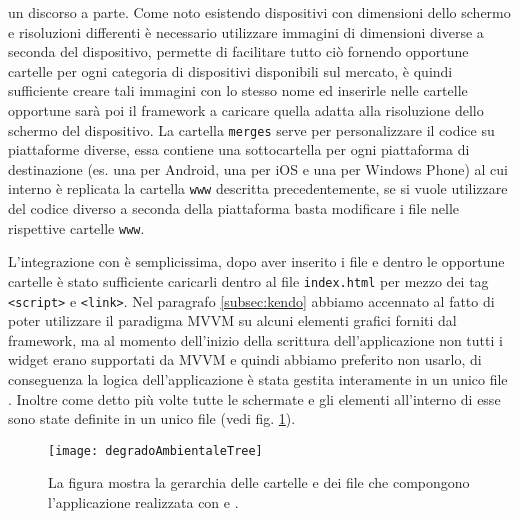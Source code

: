             un discorso a parte. Come noto esistendo
            dispositivi con dimensioni dello schermo e risoluzioni differenti
            è necessario utilizzare immagini di dimensioni diverse a seconda
            del dispositivo, \pg{} permette di facilitare tutto ciò fornendo
            opportune cartelle per ogni categoria di dispositivi disponibili sul
            mercato, è quindi sufficiente creare tali immagini con lo stesso nome
            ed inserirle nelle cartelle opportune sarà poi il framework a caricare
            quella adatta alla risoluzione dello schermo del dispositivo.
            La cartella \texttt{merges} serve per personalizzare il codice su piattaforme
            diverse, essa contiene una sottocartella per ogni piattaforma di destinazione
            (es. una per Android, una per iOS e una per Windows Phone)
            al cui interno è replicata la cartella \texttt{www} descritta precedentemente,
            se si vuole utilizzare del codice diverso a seconda della piattaforma
            basta modificare i file nelle rispettive cartelle \texttt{www}.

            L'integrazione con \kendomob{} è semplicissima, dopo aver inserito
            i file \js{} e \css{} dentro le opportune cartelle è stato sufficiente
            caricarli dentro al file \texttt{index.html} per mezzo dei tag
            \texttt{<script>} e \texttt{<link>}.
            Nel paragrafo \ref{subsec:kendo} abbiamo accennato al fatto di poter
            utilizzare il paradigma MVVM su alcuni elementi grafici forniti dal
            framework, ma al momento dell'inizio della scrittura dell'applicazione
            non tutti i widget erano supportati da MVVM e quindi abbiamo preferito
            non usarlo, di conseguenza la logica dell'applicazione è stata gestita
            interamente in un unico file \js{}. Inoltre come detto più volte
            tutte le schermate e gli elementi all'interno di esse sono state
            definite in un unico file \html{} (vedi fig. \ref{fig:degradoAmbientaleTree}).
            \begin{figure}[H]
                \centering
                \texttt{[image: degradoAmbientaleTree]}
                \caption{
                La figura mostra la gerarchia delle cartelle e dei file che
                compongono l'applicazione realizzata con \pg{} e \kendomob{}.
                }
                \label{fig:degradoAmbientaleTree}
            \end{figure}


